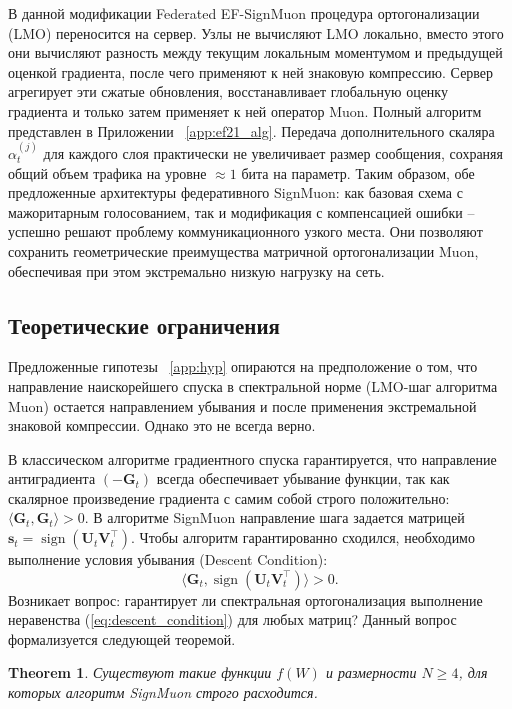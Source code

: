\documentclass{article}
\newtheorem{theorem}{Theorem}
\begin{document}
В данной модификации Federated EF-SignMuon процедура ортогонализации (LMO) переносится на сервер. Узлы не вычисляют LMO локально, вместо этого они вычисляют разность между текущим локальным моментумом и предыдущей оценкой градиента, после чего применяют к ней знаковую компрессию. Сервер агрегирует эти сжатые обновления, восстанавливает глобальную оценку градиента и только затем применяет к ней оператор Muon. Полный алгоритм представлен в Приложении ~\ref{app:ef21_alg}. Передача дополнительного скаляра $\alpha_t^{(j)}$ для каждого слоя практически не увеличивает размер сообщения, сохраняя общий объем трафика на уровне $\approx 1$ бита на параметр. Таким образом, обе предложенные архитектуры федеративного SignMuon: как базовая схема с мажоритарным голосованием, так и модификация с компенсацией ошибки -- успешно решают проблему коммуникационного узкого места. Они позволяют сохранить геометрические преимущества матричной ортогонализации Muon, обеспечивая при этом экстремально низкую нагрузку на сеть.

\subsection{Теоретические ограничения}
Предложенные гипотезы ~\ref{app:hyp} опираются на предположение о том, что направление наискорейшего спуска в спектральной норме (LMO-шаг алгоритма Muon) остается направлением убывания и после применения экстремальной знаковой компрессии. Однако это не всегда верно. 

В классическом алгоритме градиентного спуска гарантируется, что направление антиградиента $(-\mathbf{G}_t)$ всегда обеспечивает убывание функции, так как скалярное произведение градиента с самим собой строго положительно: $\langle \mathbf{G}_t, \mathbf{G}_t \rangle > 0$. В алгоритме SignMuon направление шага задается матрицей $\mathbf{s}_t = \operatorname{sign}(\mathbf{U}_t \mathbf{V}_t^\top)$. Чтобы алгоритм гарантированно сходился, необходимо выполнение условия убывания (Descent Condition):
\begin{equation}
\langle \mathbf{G}_t, \operatorname{sign}(\mathbf{U}_t \mathbf{V}_t^\top) \rangle > 0.
\label{eq:descent_condition}
\end{equation}
Возникает вопрос: гарантирует ли спектральная ортогонализация выполнение неравенства (\ref{eq:descent_condition}) для любых матриц? Данный вопрос формализуется следующей теоремой. 

\begin{theorem}\label{th:1} Существуют такие функции $f(W)$ и размерности $N \geq 4$, для которых алгоритм SignMuon строго расходится.
\end{theorem}
\end{document}
